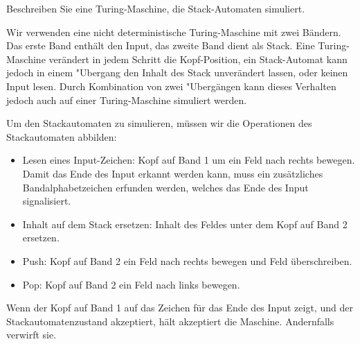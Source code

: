Beschreiben Sie eine Turing-Maschine, die Stack-Automaten simuliert.


\begin{loesung}
Wir verwenden eine nicht deterministische Turing-Maschine mit zwei Bändern.
Das erste Band
enthält den Input, das zweite Band dient als Stack. Eine Turing-Maschine
verändert in jedem Schritt die Kopf-Position, ein Stack-Automat kann
jedoch in einem "Ubergang den Inhalt des Stack unverändert lassen,
oder keinen Input lesen. Durch Kombination von zwei "Ubergängen
kann dieses Verhalten jedoch auch auf einer Turing-Maschine simuliert
werden.

Um den Stackautomaten zu simulieren, müssen wir die Operationen des
Stackautomaten abbilden:
\begin{itemize}
\item Lesen eines Input-Zeichen: Kopf auf Band 1 um ein Feld nach
rechts bewegen. Damit das Ende des Input erkannt werden kann, muss ein
zusätzliches Bandalphabetzeichen erfunden werden, welches das Ende
des Input signalisiert.
\item Inhalt auf dem Stack ersetzen: Inhalt des Feldes unter dem Kopf
auf Band 2 ersetzen.
\item Push: Kopf auf Band 2 ein Feld nach rechts bewegen und Feld überschreiben.
\item Pop: Kopf auf Band 2 ein Feld nach links bewegen.
\end{itemize}
Wenn der Kopf auf Band 1 auf das Zeichen für das Ende des Input zeigt,
und der Stackautomatenzustand akzeptiert, hält akzeptiert die Maschine.
Andernfalls verwirft sie.
\end{loesung}

